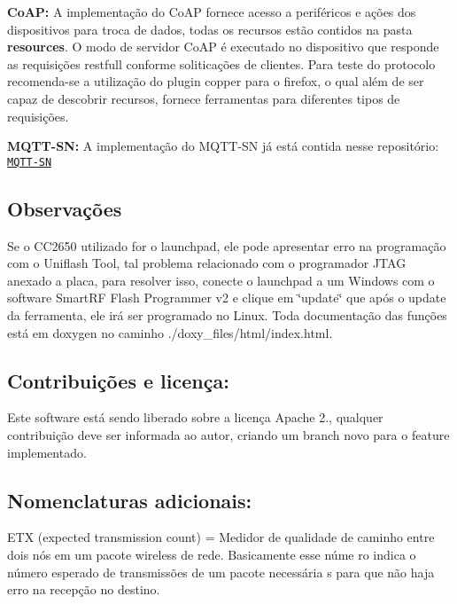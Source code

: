 {\bfseries Co\+A\+P\+:} A implementação do Co\+A\+P fornece acesso a periféricos e ações dos dispositivos para troca de dados, todas os recursos estão contidos na pasta {\bfseries resources}. O modo de servidor Co\+A\+P é executado no dispositivo que responde as requisições restfull conforme soliticações de clientes. Para teste do protocolo recomenda-\/se a utilização do plugin copper para o firefox, o qual além de ser capaz de descobrir recursos, fornece ferramentas para diferentes tipos de requisições. 

{\bfseries M\+Q\+T\+T-\/\+S\+N\+:} A implementação do M\+Q\+T\+T-\/\+S\+N já está contida nesse repositório\+: \href{https://github.com/aignacio/MQTT-SN-Contiki---HomeStark}{\tt M\+Q\+T\+T-\/\+S\+N}

\subsection*{Observações}

Se o C\+C2650 utilizado for o launchpad, ele pode apresentar erro na programação com o Uniflash Tool, tal problema relacionado com o programador J\+T\+A\+G anexado a placa, para resolver isso, conecte o launchpad a um Windows com o software Smart\+R\+F Flash Programmer v2 e clique em \char`\"{}update\char`\"{} que após o update da ferramenta, ele irá ser programado no Linux. Toda documentação das funções está em doxygen no caminho ./doxy\+\_\+files/html/index.html.

\subsection*{Contribuições e licença\+:}

Este software está sendo liberado sobre a licença Apache 2., qualquer contribuição deve ser informada ao autor, criando um branch novo para o feature implementado.

\subsection*{Nomenclaturas adicionais\+:}

E\+T\+X (expected transmission count) = Medidor de qualidade de caminho entre dois nós em um pacote wireless de rede. Basicamente esse núme ro indica o número esperado de transmissões de um pacote necessária s para que não haja erro na recepção no destino. 
